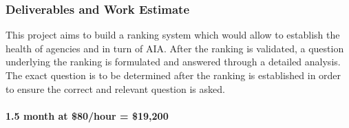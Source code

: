 \documentclass{article}
\begin{document}
\subsubsection{Deliverables and Work Estimate}
This project aims to build a ranking system which would allow to establish the health of agencies and in turn of AIA.
After the ranking is validated, a question underlying the ranking is formulated and answered through a detailed analysis. 
The exact question is to be determined after the ranking is established in order to ensure the correct and relevant question is asked.   
~\\
~\\
\textbf{1.5 month at \$80/hour = \$19,200}
\end{document}
